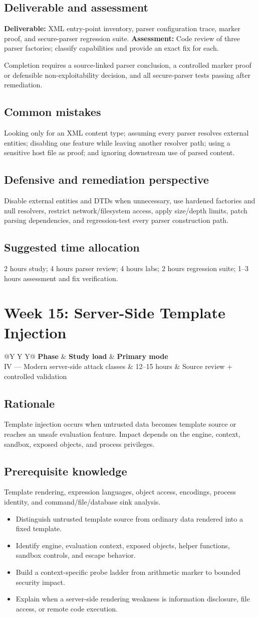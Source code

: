 \documentclass[11pt]{article}
\makeatletter
\newcommand{\weekheader}[4]{%
  \clearpage
  \section{Week #1: #2}
  \begin{tcolorbox}[colback=Navy,colframe=Navy,coltext=white]
    \begin{tabularx}{\linewidth}{@{}Y Y Y@{}}
      \textbf{Phase} & \textbf{Study load} & \textbf{Primary mode}\\
      #3 & #4 hours & Source review + controlled validation
    \end{tabularx}
  \end{tcolorbox}
}
\newcommand{\weekfield}[2]{%
  \Needspace{5\baselineskip}
  \subsection*{#1}
  #2
}
\newcommand{\deliverable}[1]{\textbf{Deliverable:} #1}
\newcommand{\assessment}[1]{\textbf{Assessment:} #1}
\makeatother
\begin{document}
\weekfield{Deliverable and assessment}{\deliverable{XML entry-point inventory,
parser configuration trace, marker proof, and secure-parser regression suite.}
\assessment{Code review of three parser factories; classify capabilities and
provide an exact fix for each.}}

\begin{checkpoints}
Completion requires a source-linked parser conclusion, a controlled marker proof
or defensible non-exploitability decision, and all secure-parser tests passing
after remediation.
\end{checkpoints}

\weekfield{Common mistakes}{Looking only for an XML content type; assuming every
parser resolves external entities; disabling one feature while leaving another
resolver path; using a sensitive host file as proof; and ignoring downstream use
of parsed content.}

\weekfield{Defensive and remediation perspective}{Disable external entities and
DTDs when unnecessary, use hardened factories and null resolvers, restrict
network/filesystem access, apply size/depth limits, patch parsing dependencies,
and regression-test every parser construction path.}

\weekfield{Suggested time allocation}{2 hours study; 4 hours parser review; 4
hours labs; 2 hours regression suite; 1--3 hours assessment and fix verification.}

\weekheader{15}{Server-Side Template Injection}{IV --- Modern server-side attack classes}{12--15}

\weekfield{Rationale}{Template injection occurs when untrusted data becomes
template source or reaches an unsafe evaluation feature. Impact depends on the
engine, context, sandbox, exposed objects, and process privileges.}

\weekfield{Prerequisite knowledge}{Template rendering, expression languages,
object access, encodings, process identity, and command/file/database sink
analysis.}

\begin{objectivebox}
\begin{itemize}
  \item Distinguish untrusted template source from ordinary data rendered into a fixed template.
  \item Identify engine, evaluation context, exposed objects, helper functions, sandbox controls, and escape behavior.
  \item Build a context-specific probe ladder from arithmetic marker to bounded security impact.
  \item Explain when a server-side rendering weakness is information disclosure, file access, or remote code execution.
\end{itemize}
\end{objectivebox}
\end{document}
